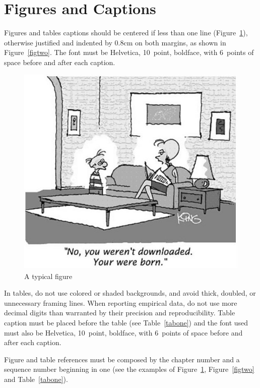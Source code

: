 \section{Figures and Captions}
\label{sec:captionmargins}
Figures and tables captions should be centered if less than one line
(Figure~\ref{figone}), otherwise justified and indented by 0.8cm on
both margins, as shown in Figure~\ref{figtwo}. The font must be
Helvetica, 10~point, boldface, with 6~points of space before and after
each caption.

\begin{figure}[h!]
	\centerline{\includegraphics{fig1}}
	\caption{A typical figure}
	\label{figone}
\end{figure}

In tables, do not use colored or shaded backgrounds, and avoid thick,
doubled, or unnecessary framing lines. When reporting empirical data,
do not use more decimal digits than warranted by their precision and
reproducibility. Table caption must be placed before the table (see
Table~\ref{tabone}) and the font used must also be Helvetica,
10~point, boldface, with 6~points of space before and after each
caption.

Figure and table references must be composed by the chapter number and
a sequence number beginning in one (see the examples of
Figure~\ref{figone}, Figure~\ref{figtwo} and Table~\ref{tabone}).


